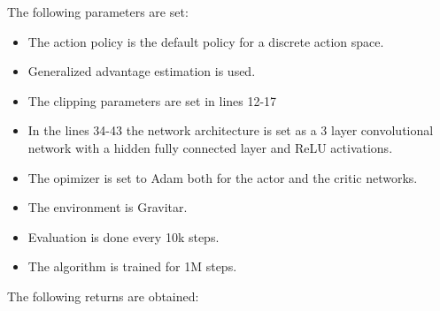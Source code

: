 \documentclass[12pt,a4paper]{report}
\begin{document}
	The following parameters are set:
	\begin{itemize}
		\item The action policy is the default policy for a discrete action space.
		\item Generalized advantage estimation is used.
		\item The clipping parameters are set in lines 12-17
		\item In the lines 34-43 the network architecture is set as a 3 layer convolutional network with a hidden fully connected layer and ReLU activations.
		\item The opimizer is set to Adam both for the actor and the critic networks.
		\item The environment is Gravitar.
		\item Evaluation is done every 10k steps.
		\item The algorithm is trained for 1M steps.
	\end{itemize}
	 \pagebreak
	The following returns are obtained:
	
\end{document}
